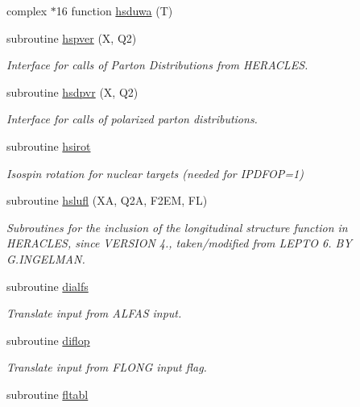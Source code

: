 \begin{DoxyCompactItemize}
\item 
complex $\ast$16 function \hyperlink{djangoh__h_8f_afe5273222943b51794b89c1840ac6eb3}{hsduwa} (T)
\item 
subroutine \hyperlink{djangoh__h_8f_aa40c6a855b7d29b0a422c53c6f672ea4}{hspver} (X, Q2)
\begin{DoxyCompactList}\small\item\em Interface for calls of Parton Distributions from H\+E\+R\+A\+C\+L\+ES. \end{DoxyCompactList}\item 
subroutine \hyperlink{djangoh__h_8f_a036460f40105c386bb59c0ba11b4646b}{hsdpvr} (X, Q2)
\begin{DoxyCompactList}\small\item\em Interface for calls of polarized parton distributions. \end{DoxyCompactList}\item 
subroutine \hyperlink{djangoh__h_8f_a243cf7ba8798a80242e649f4a13e10ad}{hsirot}
\begin{DoxyCompactList}\small\item\em Isospin rotation for nuclear targets (needed for I\+P\+D\+F\+OP=1) \end{DoxyCompactList}\item 
subroutine \hyperlink{djangoh__h_8f_a889eab824e641752043b6bae2c8aba72}{hslufl} (XA, Q2A, F2\+EM, FL)
\begin{DoxyCompactList}\small\item\em Subroutines for the inclusion of the longitudinal structure function in H\+E\+R\+A\+C\+L\+ES, since V\+E\+R\+S\+I\+ON 4., taken/modified from L\+E\+P\+TO 6. BY G.\+I\+N\+G\+E\+L\+M\+AN. \end{DoxyCompactList}\item 
subroutine \hyperlink{djangoh__h_8f_a39c10764d264dab5d56cc9fea546fa7e}{dialfs}
\begin{DoxyCompactList}\small\item\em Translate input from A\+L\+F\+AS input. \end{DoxyCompactList}\item 
subroutine \hyperlink{djangoh__h_8f_af3db73fbfc8ef656d8b70e305ebf58f2}{diflop}
\begin{DoxyCompactList}\small\item\em Translate input from F\+L\+O\+NG input flag. \end{DoxyCompactList}\item 
subroutine \hyperlink{djangoh__h_8f_adf34c55e43074be390c1c3f2bde92bc3}{fltabl}

\end{DoxyCompactItemize}
